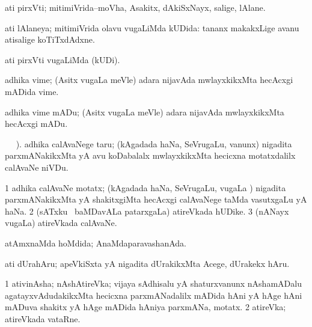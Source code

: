\bentry
{}
\gl{\nA}
\bmng
ati pirxVti; mitimiVrida--moVha, Asakitx, dAkiSxNayx, salige, lAlane. 
\emng
\eentry

\bentry
{}
\gl{\nA}
\bmng
ati lAlaneya; mitimiVrida olavu \mo vugaLiMda kUDida:  tananx makakxLige avanu atisalige koTiTxdAdxne. 
\emng
\eentry


\bentry
{}
\gl{\kirxvi}
\bmng
ati pirxVti \mo vugaLiMda (kUDi). 
\emng
\eentry


\bentry
{}
\gl{\nA}
\bmng
adhika vime; (Asitx \mo vugaLa meVle) adara nijavAda mwlayxkikxMta hecAcxgi mADida vime. 
\emng
\eentry


\bentry
{}
\gl{\sakirx}
\bmng
adhika vime mADu; (Asitx \mo vugaLa meVle) adara nijavAda mwlayxkikxMta hecAcxgi mADu. 
\emng
\eentry


\bentry
{}
\gl{\sakirx}
\BUkaq\  \vakaq\ ). \bmng
adhika calAvaNege taru; (kAgadada haNa, SeVrugaLu, \mo vanunx) nigadita parxmANakikxMta yA avu koDabalalx mwlayxkikxMta hecicxna motatxdalilx calAvaNe niVDu. 
\emng
\eentry


\bentry
{}
\gl{\nA}
\bmng
\bnum
\num{1} adhika calAvaNe motatx; (kAgadada haNa, SeVrugaLu, \mo vugaLa \vi) nigadita parxmANakikxMta yA shakitxgiMta hecAcxgi calAvaNege taMda vasutxgaLu yA haNa. 
\num{2} (sATxku \mo\ baMDavALa patarxgaLa) atireVkada hUDike. 
\num{3} (nANayx \mo vugaLa) atireVkada calAvaNe. 
\enum
\emng
\eentry


\bentry
{}
\gl{\gu}
\bmng
atAmxnaMda hoMdida; AnaMdaparavashanAda. 
\emng
\eentry


\bentry
{}
\gl{\akirx}
\bmng
ati dUrahAru; apeVkiSxta yA nigadita dUrakikxMta Acege, dUrakekx hAru. 
\emng
\eentry


\bentry
{}
\gl{\nA}
\bmng
\bnum
\num{1} ativinAsha; nAshAtireVka; vijaya sAdhisalu yA shaturxvanunx nAshamADalu agatayxvAdudakikxMta hecicxna parxmANadalilx mADida hAni yA hAge hAni mADuva shakitx yA hAge mADida hAniya parxmANa, motatx. 
\num{2} atireVka; atireVkada vataRne. 
\enum
\emng
\eentry


